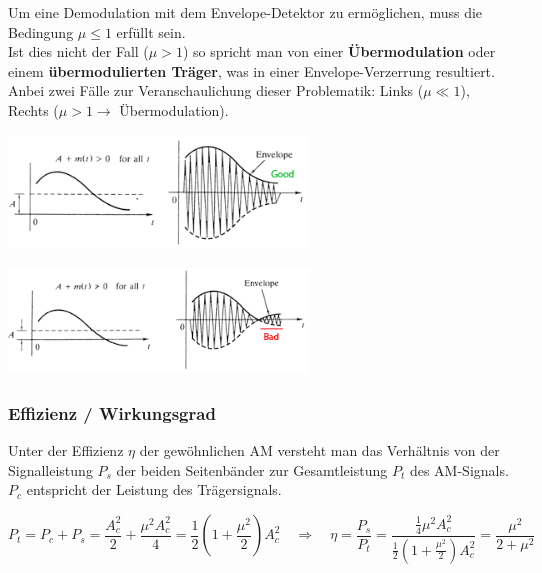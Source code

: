Um eine Demodulation mit dem Envelope-Detektor zu ermöglichen, muss die Bedingung 
\textbf{$\mu \leq 1$} erfüllt sein. \\
Ist dies nicht der Fall (\textbf{$\mu > 1$}) so spricht man von einer \textbf{Übermodulation} oder
einem  \textbf{übermodulierten Träger}, was in einer Envelope-Verzerrung resultiert. \\
Anbei zwei Fälle zur Veranschaulichung dieser Problematik: Links ($\mu \ll 1$), Rechts ($\mu > 1
\rightarrow $ Übermodulation).

\begin{minipage}[t][2.3cm][c]{9.5cm}
	\begin{center}
      \includegraphics[width=8cm]{bilder/am_oam_enveloppeGood.png}
	\end{center}
\end{minipage}
\begin{minipage}[t][2.3cm][c]{9.5cm}
    \begin{center}
    	\includegraphics[width=8cm]{bilder/am_oam_enveloppeBad.png}
	\end{center}
\end{minipage}

\subsubsection{Effizienz / Wirkungsgrad }
Unter der Effizienz $ \eta $ der gewöhnlichen AM versteht man das Verhältnis von der Signalleistung
$P_s$ der beiden Seitenbänder zur Gesamtleistung $P_t$ des AM-Signals. $P_c$ entspricht der Leistung des Trägersignals.

\[ P_t = P_c + P_s = \frac{A_c^2}{2} + \frac{\mu^2 A_c^2}{4} = \frac{1}{2}(1 + \frac{\mu^2}{2})A_c^2 \quad 
\Longrightarrow 
\quad \eta = \frac{P_s}{P_t} = \frac{\frac{1}{4}\mu^2 A_c^2}{\frac{1}{2}(1 + \frac{\mu^2}{2})A_c^2} = \frac{\mu^2}{2 + \mu^2}\]


